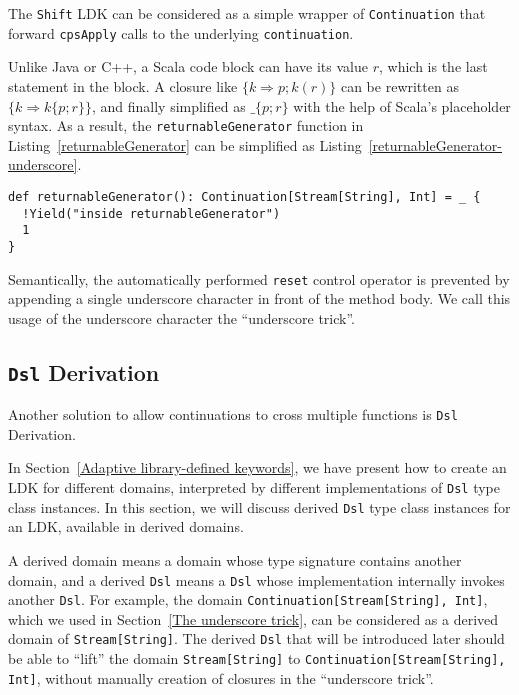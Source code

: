 The \lstinline{Shift} LDK can be considered as a simple wrapper of \lstinline{Continuation} that forward \lstinline{cpsApply} calls to the underlying \lstinline{continuation}.

Unlike Java or C++, a Scala code block can have its value $r$, which is the last statement in the block. A closure like $\{ k \Rightarrow p; k(r) \}$ can be rewritten as $\{ k \Rightarrow k \{ p; r \} \}$, and finally simplified as $\_ \{ p; r \}$ with the help of Scala's placeholder syntax. As a result, the \lstinline{returnableGenerator} function in Listing~\ref{returnableGenerator} can be simplified as Listing~\ref{returnableGenerator-underscore}.

\begin{lstlisting}[caption={Returning an additional value in LDK-based generators, written in the underscore trick},label={returnableGenerator-underscore}]
def returnableGenerator(): Continuation[Stream[String], Int] = _ {
  !Yield("inside returnableGenerator")
  1
}
\end{lstlisting}

Semantically, the automatically performed \lstinline{reset} control operator is prevented by appending a single underscore character in front of the method body. We call this usage of the underscore character the ``underscore trick''.

\subsection{\lstinline{Dsl} Derivation}\label{Dsl derivation}

Another solution to allow continuations to cross multiple functions is \lstinline{Dsl} Derivation.

In Section~\ref{Adaptive library-defined keywords}, we have present how to create an LDK for different domains, interpreted by different implementations of \lstinline{Dsl} type class instances. In this section, we will discuss derived \lstinline{Dsl} type class instances for an LDK, available in derived domains.

A derived domain means a domain whose type signature contains another domain, and a derived \lstinline{Dsl} means a \lstinline{Dsl} whose implementation internally invokes another \lstinline{Dsl}. For example, the domain \lstinline{Continuation[Stream[String], Int]}, which we used in Section~\ref{The underscore trick}, can be considered as a derived domain of \lstinline{Stream[String]}. The derived \lstinline{Dsl} that will be introduced later should be able to ``lift'' the domain \lstinline{Stream[String]} to \lstinline{Continuation[Stream[String], Int]}, without manually creation of closures in the ``underscore trick''.

